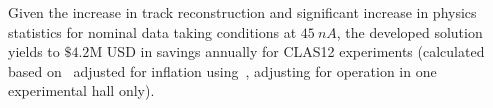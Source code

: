 Given the increase in track reconstruction and significant increase in physics statistics for nominal data taking conditions at $45~nA$, the developed solution yields to $\$4.2$M USD in savings annually for CLAS12 experiments (calculated based on~\cite{CEBAF:oper} adjusted for inflation using~\cite{GoogleDotCom}, adjusting for operation in one experimental hall only). 


